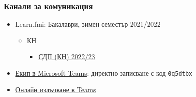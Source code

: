 \documentclass{beamer}
\begin{document}
\begin{frame}
  \frametitle{Канали за комуникация}
  \begin{itemize}
  \item Learn.fmi: Бакалаври, зимен семестър 2021/2022
    \begin{itemize}
    \item КН
      \begin{itemize}
      \item \href{https://learn.fmi.uni-sofia.bg/course/view.php?id=8509}{СДП (КН) 2022/23}
      \end{itemize}
    \end{itemize}
  \item \href{https://teams.microsoft.com/l/team/19\%3aUZEWpZa64z9Ns2tWRqscadTdQgtEunExCO5p-zOo1Lg1\%40thread.tacv2/conversations?groupId=01c838dc-0d43-4b32-a71a-e209f21f0551&tenantId=9d05c5fb-e448-4700-8a58-e15b93c84ea9}{Екип в Microsoft Teams}: директно записване с код \tt{0q5dtbx}
  \item \href{https://teams.microsoft.com/l/meetup-join/19\%3a07f7f2f74bdf434cbcaefdca4d10427a\%40thread.tacv2/1664915548412?context=\%7b\%22Tid\%22\%3a\%229d05c5fb-e448-4700-8a58-e15b93c84ea9\%22\%2c\%22Oid\%22\%3a\%227354cd98-c695-434c-afd6-2d519f48fa53\%22\%7d}{Онлайн излъчване в Teams}
  \end{itemize}
\end{frame}
\end{document}
